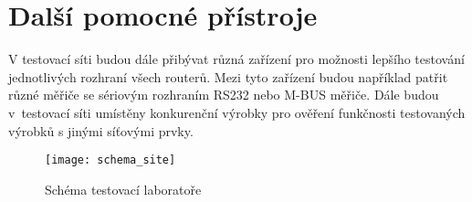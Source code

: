 \section{Další pomocné přístroje}
V testovací síti budou dále přibývat různá zařízení pro možnosti lepšího testování jednotlivých rozhraní všech routerů. Mezi tyto zařízení budou například patřit různé měřiče se sériovým rozhraním RS232 nebo M-BUS měřiče. Dále budou v~testovací síti umístěny konkurenční výrobky pro ověření funkčnosti testovaných výrobků s jinými síťovými prvky.

\begin{figure}[h]
  \centering
  \texttt{[image: schema\_site]}
  \caption{Schéma testovací laboratoře}
  \label{fig:schema_site}
\end{figure}

\endinput
